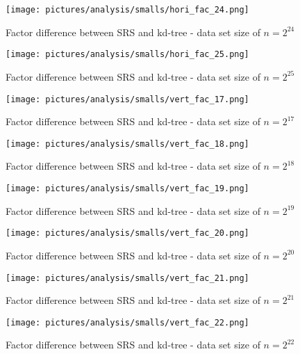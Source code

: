 \begin{figure}[h]
    \centering
    \texttt{[image: pictures/analysis/smalls/hori\_fac\_24.png]}
    \caption{Factor difference between SRS and kd-tree - data set size of $n=2^{24}$}\label{fig:small_hori_fac_24}
\end{figure}

\begin{figure}[h]
    \centering
    \texttt{[image: pictures/analysis/smalls/hori\_fac\_25.png]}
    \caption{Factor difference between SRS and kd-tree - data set size of $n=2^{25}$}\label{fig:small_hori_fac_25}
\end{figure}
\clearpage

\begin{figure}[h]
    \centering
    \texttt{[image: pictures/analysis/smalls/vert\_fac\_17.png]}
    \caption{Factor difference between SRS and kd-tree - data set size of $n=2^{17}$}\label{fig:small_vert_fac_17}
\end{figure}

\begin{figure}[h]
    \centering
    \texttt{[image: pictures/analysis/smalls/vert\_fac\_18.png]}
    \caption{Factor difference between SRS and kd-tree - data set size of $n=2^{18}$}\label{fig:small_vert_fac_18}
\end{figure}

\begin{figure}[h]
    \centering
    \texttt{[image: pictures/analysis/smalls/vert\_fac\_19.png]}
    \caption{Factor difference between SRS and kd-tree - data set size of $n=2^{19}$}\label{fig:small_vert_fac_19}
\end{figure}

\begin{figure}[h]
    \centering
    \texttt{[image: pictures/analysis/smalls/vert\_fac\_20.png]}
    \caption{Factor difference between SRS and kd-tree - data set size of $n=2^{20}$}\label{fig:small_vert_fac_20}
\end{figure}

\begin{figure}[h]
    \centering
    \texttt{[image: pictures/analysis/smalls/vert\_fac\_21.png]}
    \caption{Factor difference between SRS and kd-tree - data set size of $n=2^{21}$}\label{fig:small_vert_fac_21}
\end{figure}

\begin{figure}[h]
    \centering
    \texttt{[image: pictures/analysis/smalls/vert\_fac\_22.png]}
    \caption{Factor difference between SRS and kd-tree - data set size of $n=2^{22}$}\label{fig:small_vert_fac_22}
\end{figure}

